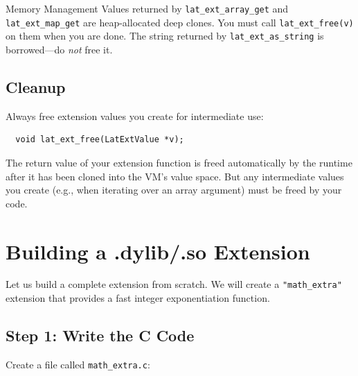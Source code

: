 \begin{warnbox}{Memory Management}
Values returned by \lstinline|lat_ext_array_get| and \lstinline|lat_ext_map_get| are heap-allocated deep clones.
You must call \lstinline|lat_ext_free(v)| on them when you are done.
The string returned by \lstinline|lat_ext_as_string| is borrowed---do \emph{not} free it.
\end{warnbox}

\subsection{Cleanup}

Always free extension values you create for intermediate use:

\begin{verbatim}
  void lat_ext_free(LatExtValue *v);
\end{verbatim}

The return value of your extension function is freed automatically by the runtime after it has been cloned into the VM's value space.
But any intermediate values you create (e.g., when iterating over an array argument) must be freed by your code.


\section{Building a .dylib/.so Extension}\label{sec:building-ext}

Let us build a complete extension from scratch.
We will create a \lstinline|"math_extra"| extension that provides a fast integer exponentiation function.

\subsection{Step 1: Write the C Code}

Create a file called \lstinline|math_extra.c|:

